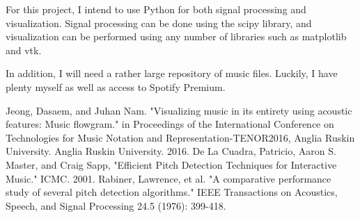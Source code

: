 \documentclass[12pt, a4paper]{article}
\begin{document}
For this project, I intend to use Python for both signal processing and
visualization. Signal processing can be done using the scipy library, and
visualization can be performed using any number of libraries such as
matplotlib and vtk.

In addition, I will need a rather large repository of music files. Luckily,
I have plenty myself as well as access to Spotify Premium.

\begin{thebibliography}{9}
 Jeong, Dasaem, and Juhan Nam. "Visualizing music in its entirety
using acoustic features: Music flowgram." in Proceedings of the International
Conference on Technologies for Music Notation and Representation-TENOR2016,
Anglia Ruskin University. Anglia Ruskin University. 2016.
 De La Cuadra, Patricio, Aaron S. Master, and Craig Sapp,
"Efficient Pitch Detection Techniques for Interactive Music." ICMC. 2001.
 Rabiner, Lawrence, et al. "A comparative performance study of several
pitch detection algorithms." IEEE Transactions on Acoustics, Speech, and Signal
Processing 24.5 (1976): 399-418.
\end{thebibliography}
\end{document}
